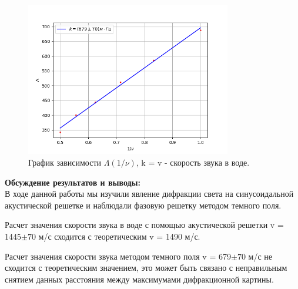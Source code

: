 \documentclass[a4paper, 12pt]{article}%
\begin{document}
\begin{enumerate}
	\begin{figure}[h!]
		\centering	
		\includegraphics[width=0.8\textwidth]{L(nu).png}
		\caption{График зависимости $\Lambda(1/\nu)$, k = v - скорость звука в воде.}
	\end{figure}
	
	
	\end{enumerate}
	
	
	
	\textbf{Обсуждение результатов и выводы: }\\
	
	В ходе данной работы мы изучили явление дифракции света на синусоидальной акустической решетке и наблюдали фазовую решетку методом темного поля.
	
	Расчет значения скорости звука в воде с помощью акустической решетки v = 1445$\pm 70$ м/с сходится с теоретическим v = 1490 м/с.
	
	Расчет значения скорости звука методом темного поля v = 679$\pm 70$ м/с не сходится с теоретическим значением, это может быть связано с неправильным снятием данных расстояния между максимумами дифракционной картины.
	
	
	
	
	
	
	
	
	
	
	
	
	
	
	
	
	
	
	
	
	
	
	
	
	
	
	
	
	
	
	
	
	
	
	
	
	
	
	
	
	
	
	
	
	
	
	
	
\end{document}
